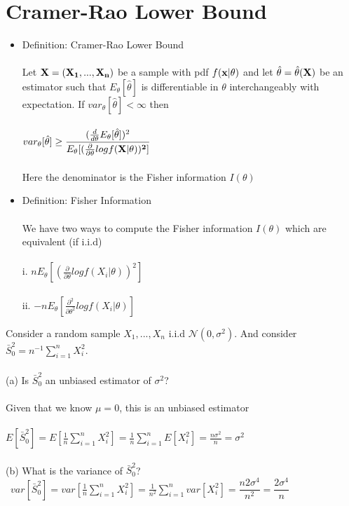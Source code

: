\documentclass{article}
\begin{document}
\section{Cramer-Rao Lower Bound}
\begin{itemize}
    \item Definition: Cramer-Rao Lower Bound\\\\
    Let $\bf{X}=(X_1,...,X_n)$ be a sample with pdf $f(\bf{x}|\theta)$ and let $\hat{\theta}=\hat{\theta}(\bf{X})$ be an estimator such that $E_\theta[\hat{\theta}]$ is differentiable in $\theta$ interchangeably with expectation.  If $var_\theta[\hat{\theta}]<\infty$ then\\\\
    $var_\theta[\hat{\theta}]\geq\dfrac{(\frac{d}{d\theta}E_\theta[\hat{\theta}])^2}{E_\theta[(\frac{\partial}{\partial\theta}logf(\bf{X}|\theta))^2]}$\\\\
    Here the denominator is the Fisher information $I(\theta)$
    \item Definition: Fisher Information\\\\
    We have two ways to compute the Fisher information $I(\theta)$ which are equivalent (if i.i.d)\\\\
    i. $nE_\theta[(\frac{\partial}{\partial \theta}logf(X_i|\theta))^2]$\\\\
    ii. $-nE_\theta[\frac{\partial^2}{\partial \theta^2}logf(X_i|\theta)]$
\end{itemize}
Consider a random sample $X_1,...,X_n$ i.i.d $\mathcal{N}(0,\sigma^2)$. And consider $\bar{S}_0^2=n^{-1}\sum_{i=1}^nX_i^2$.\\\\
(a) Is $\bar{S}_0^2$ an unbiased estimator of $\sigma^2$?\\\\
Given that we know $\mu=0$, this is an unbiased estimator\\\\
$E[\bar{S}_0^2]=E[\frac{1}{n}\sum_{i=1}^nX_i^2]=\frac{1}{n}\sum_{i=1}^nE[X_i^2]=\frac{n\sigma^2}{n}=\sigma^2$\\\\
(b) What is the variance of $\bar{S}_0^2$?\\\
$var[\bar{S}_0^2]=var[\frac{1}{n}\sum_{i=1}^nX_i^2]=\frac{1}{n^2}\sum_{i=1}^nvar[X_i^2]=\dfrac{n2\sigma^4}{n^2}=\dfrac{2\sigma^4}{n}$\\\\
\end{document}
